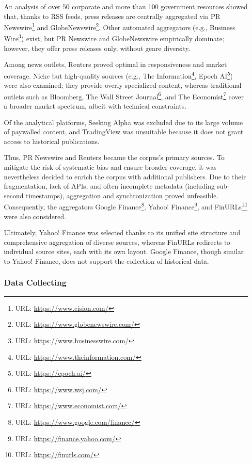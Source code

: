 An analysis of over 50 corporate and more than 100 government resources showed that, thanks to RSS feeds, press
releases are centrally aggregated via PR Newswire\footnote{URL: \url{https://www.cision.com/}} and
GlobeNewswire\footnote{URL: \url{https://www.globenewswire.com/}}. Other automated aggregators
(e.g., Business Wire\footnote{URL: \url{https://www.businesswire.com/}}) exist, but PR Newswire and GlobeNewswire
empirically dominate; however, they offer press releases only, without genre diversity.

Among news outlets, Reuters proved optimal in responsiveness and market coverage. Niche but high-quality sources
(e.g., The Information\footnote{URL: \url{https://www.theinformation.com/}}, Epoch AI\footnote{URL: \url{https://epoch.ai/}})
were also examined; they provide overly specialized content, whereas traditional outlets
such as Bloomberg, The Wall Street Journal\footnote{URL: \url{https://www.wsj.com/}},
and The Economist\footnote{URL: \url{https://www.economist.com/}} cover a broader market spectrum, albeit with
technical constraints.

Of the analytical platforms, Seeking Alpha was excluded due to its large volume of paywalled content, and TradingView
was unsuitable because it does not grant access to historical publications.

Thus, PR Newswire and Reuters became the corpus's primary sources. To mitigate the risk of systematic bias and ensure
broader coverage, it was nevertheless decided to enrich the corpus with additional publishers. Due to their fragmentation,
lack of APIs, and often incomplete metadata (including sub-second timestamps), aggregation and synchronization proved
unfeasible. Consequently, the aggregators Google Finance\footnote{URL: \url{https://www.google.com/finance/}},
Yahoo! Finance\footnote{URL: \url{https://finance.yahoo.com/}},
and FinURLs\footnote{URL: \url{https://finurls.com/}} were also considered.

Ultimately, Yahoo! Finance was selected thanks to its unified site structure and comprehensive aggregation of diverse
sources, whereas FinURLs redirects to individual source sites, each with its own layout. Google Finance, though similar
to Yahoo! Finance, does not support the collection of historical data.

\subsubsection{Data Collecting}
\label{sec:data_collecting}

